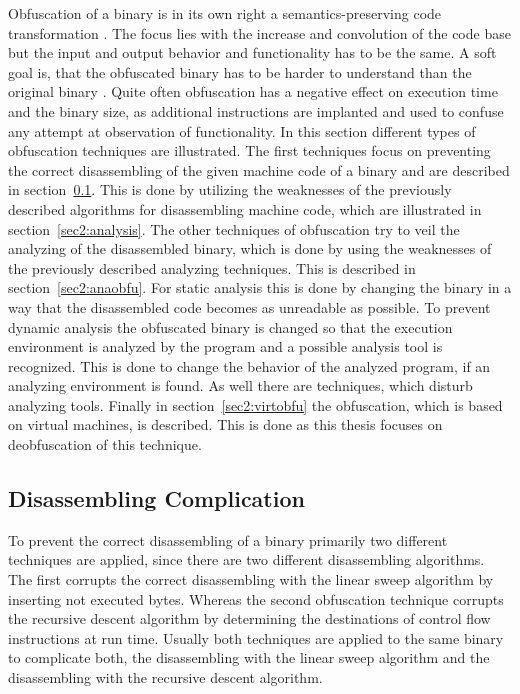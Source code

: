 \documentclass[10pt,twoside,a4paper,bibliography=totoc]{scrbook}
\begin{document}
Obfuscation of a binary is in its own right a semantics-preserving code transformation \cite{DBLP:conf/sp/YadegariJWD15}. The focus lies with the increase and convolution of the code base but the input and output behavior and functionality has to be the same.
A soft goal is, that the obfuscated binary has to be harder to understand than the original binary \cite{obfubo}.
Quite often obfuscation has a negative effect on execution time and the binary size, as additional instructions are implanted and used to confuse any attempt at observation of functionality.
In this section different types of obfuscation techniques are illustrated.
The first techniques focus on preventing the correct disassembling of the 
given machine code of a binary and are described in section~\ref{sec2:disobfu}.
This is done by utilizing the weaknesses of the previously described 
algorithms for disassembling machine code, which are illustrated in section~\ref{sec2:analysis}.
The other techniques of obfuscation try to veil the analyzing of the disassembled 
binary, which is done by using the weaknesses of the previously described 
analyzing techniques. 
This is described in section~\ref{sec2:anaobfu}.
For static analysis this is done by changing the binary in a way that the 
disassembled code becomes as unreadable as possible.
To prevent dynamic analysis the obfuscated binary is changed so that the 
execution environment is analyzed by the program and a possible analysis tool 
is recognized.
This is done to change the behavior of the analyzed program, if an analyzing 
environment is found.
As well there are techniques, which disturb analyzing tools.
Finally in section~\ref{sec2:virtobfu} the obfuscation, which is based on virtual 
machines, is described.
This is done as this thesis focuses on deobfuscation of this technique.


\subsection{Disassembling Complication}
\label{sec2:disobfu}

To prevent the correct disassembling of a binary primarily two different techniques 
are applied, since there are two different disassembling algorithms.
The first corrupts the correct disassembling with the linear sweep algorithm by
inserting not executed bytes.
Whereas the second obfuscation technique corrupts the recursive descent algorithm 
by determining the destinations of control flow instructions at run time.
Usually both techniques are applied to the same binary to complicate both,
the disassembling with the linear sweep algorithm and the disassembling with 
the recursive descent algorithm.
\end{document}
